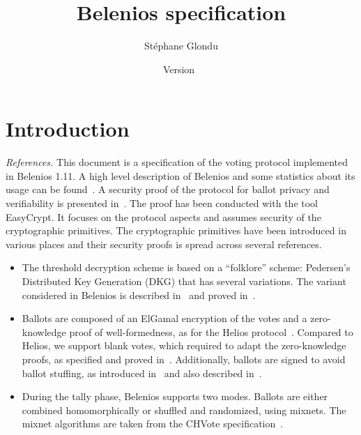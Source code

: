 \documentclass[a4paper]{article}
\title{Belenios specification}
\date{Version~\version}
\author{Stéphane Glondu}
\newcommand{\version}{1.11}
\begin{document}
\maketitle
\tableofcontents

\section{Introduction}
{\it References.}
This document is a specification of the voting protocol implemented in
Belenios \version.
A high level description of Belenios and some statistics about its
usage can be found~\cite{Belenios-Meadows2019}.
A security proof of the protocol for ballot privacy and verifiability
is presented in~\cite{Belenios-Easycrypt-CSF18}. The proof has been conducted with the
tool EasyCrypt. It focuses on the protocol aspects and assumes
security of the cryptographic primitives.
The cryptographic primitives have been introduced in various places
and their security proofs is spread across several references.
\begin{itemize}
\item 
The threshold decryption scheme is
based on a ``folklore'' scheme:
Pedersen’s~\cite{Pedersen} Distributed Key Generation (DKG) that has several variations.
The variant considered in Belenios is described in~\cite{wpes2013} and
proved in~\cite{wpes2013,asiacrypt12}.
\item Ballots are composed of an ElGamal encryption of the votes and a
  zero-knowledge proof of well-formedness, as for the Helios
  protocol~\cite{Helios}. Compared to Helios, we support blank votes,
  which required to adapt the zero-knowledge proofs, as specified and
  proved in~\cite{note-Pierrick}. Additionally, ballots are signed to
  avoid ballot stuffing, as introduced in~\cite{CGGI-esorics14} and also
  described in~\cite{Belenios-Meadows2019}.
  \item During the tally phase, Belenios supports two modes. Ballots are either combined
    homomorphically or shuffled and randomized, using mixnets. The
    mixnet algorithms are taken from the CHVote specification~\cite{CHVote}.
\end{itemize}

\end{document}
